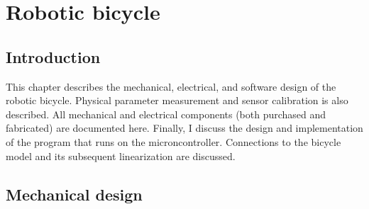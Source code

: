 \chapter{Robotic bicycle}

\addtocounter{section}{-1}
\section{Introduction}

This chapter describes the mechanical, electrical, and software design of the
robotic bicycle. Physical parameter measurement and sensor calibration is also
described.  All mechanical and electrical components (both purchased and
fabricated) are documented here.  Finally, I discuss the design and
implementation of the program that runs on the microncontroller. Connections to
the bicycle model and its subsequent linearization are discussed.

\section{Mechanical design}


